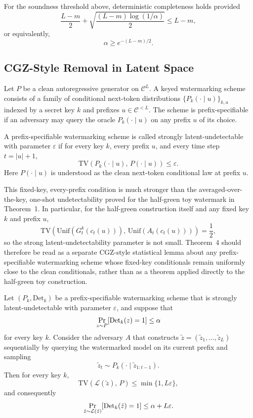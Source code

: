 \documentclass[12pt]{article}
\newcommand{\cC}{\mathcal{C}}
\newcommand{\TV}{\mathrm{TV}}
\newcommand{\Unif}{\mathrm{Unif}}
\begin{document}
For the soundness threshold above, deterministic completeness holds
provided
\[
\frac{L-m}{2} + \sqrt{\frac{(L-m)\log(1/\alpha)}{2}} \le L-m,
\]
or equivalently,
\[
\alpha \ge e^{-(L-m)/2}.
\]

\subsection{CGZ-Style Removal in Latent Space}

\begin{definition}
Let $P$ be a clean autoregressive generator on $\cC^L$. A keyed
watermarking scheme consists of a family of conditional next-token
distributions $\{P_k(\cdot \mid u)\}_{k,u}$ indexed by a secret key $k$
and prefixes $u\in \cC^{<L}$. The scheme is prefix-specifiable if an
adversary may query the oracle $P_k(\cdot \mid u)$ on any prefix $u$ of
its choice.
\end{definition}

\begin{definition}
A prefix-specifiable watermarking scheme is called strongly
latent-undetectable with parameter $\varepsilon$ if for every key $k$,
every prefix $u$, and every time step $t=|u|+1$,
\[
\TV\!\left(P_k(\cdot \mid u),\,P(\cdot \mid u)\right)\le \varepsilon.
\]
Here $P(\cdot\mid u)$ is understood as the clean next-token conditional
law at prefix $u$.
\end{definition}

This fixed-key, every-prefix condition is much stronger than the
averaged-over-the-key, one-shot undetectability proved for the
half-green toy watermark in Theorem~1. In particular, for the
half-green construction itself and any fixed key $k$ and prefix $u$,
\[
\TV\!\left(\Unif(G_t^k(c_t(u))),\,\Unif(A_t(c_t(u)))\right)=\frac{1}{2},
\]
so the strong latent-undetectability parameter is not small. Theorem~4
should therefore be read as a separate CGZ-style statistical lemma
about any prefix-specifiable watermarking scheme whose fixed-key
conditionals remain uniformly close to the clean conditionals, rather
than as a theorem applied directly to the half-green toy construction.

\begin{theorem}
Let $(P_k,\mathrm{Det}_k)$ be a prefix-specifiable watermarking scheme
that is strongly latent-undetectable with parameter $\varepsilon$, and
suppose that
\[
\Prob[z\sim P]{\mathrm{Det}_k(z)=1}\le \alpha
\]
for every key $k$. Consider the adversary $A$ that constructs
$\tilde z=(\tilde z_1,\dots,\tilde z_L)$ sequentially by querying the
watermarked model on its current prefix and sampling
\[
\tilde z_t \sim P_k(\cdot \mid \tilde z_{1:t-1}).
\]
Then for every key $k$,
\[
\TV\!\left(\mathcal{L}(\tilde z),\,P\right)\le \min\{1,L\varepsilon\},
\]
and consequently
\[
\Prob[\tilde z\sim \mathcal{L}(\tilde z)]{\mathrm{Det}_k(\tilde z)=1}
\le \alpha + L\varepsilon.
\]
\end{theorem}
\end{document}
